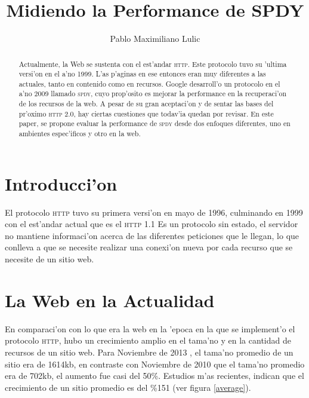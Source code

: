 \documentclass[a4paper,11pt,twocolumn]{article}
\begin{document}
\setlength{\columnsep}{25pt}

\title{Midiendo la Performance de SPDY}
\author{Pablo Maximiliano Lulic}

\maketitle

\begin{abstract} 
Actualmente, la Web se sustenta con el est'andar \textsc{http}. Este protocolo tuvo su 'ultima versi'on en el a'no 1999. L'as p'aginas en ese entonces eran muy diferentes a las actuales, tanto en contenido como en recursos. Google desarroll'o un protocolo en el a'no 2009 llamado \textsc{spdy}, cuyo prop'osito es mejorar la performance en la recuperaci'on de los recursos de la web. A pesar de su gran aceptaci'on y de sentar las bases del pr'oximo \textsc{http 2.0}, hay ciertas cuestiones que todav'ia quedan por revisar. En este paper, se propone evaluar la performance de \textsc{spdy} desde dos enfoques diferentes, uno en ambientes espec'ificos y otro en la web.
\end{abstract}

\section{Introducci'on}

El protocolo \textsc{http} tuvo su primera versi'on en mayo de 1996, culminando en 1999 con el est'andar actual que es el \textsc{http}  1.1 \cite{rfcHTTP} Es un protocolo sin estado, el servidor no mantiene informaci'on acerca de las diferentes peticiones que le llegan, lo que conlleva a que se necesite realizar una conexi'on nueva por cada recurso que se necesite de un sitio web.

\section{La Web en la Actualidad}

En comparaci'on con lo que era la web en la 'epoca en la que se implement'o el protocolo \textsc{http}, hubo un crecimiento amplio en el tama'no y en la cantidad de recursos de un sitio web. Para Noviembre de 2013 \cite{httpArchive}, el tama'no promedio de un sitio era de 1614kb, en contraste con Noviembre de 2010 que el tama'no promedio era de 702kb, el aumento fue casi del 50\%. Estudios m'as recientes, indican que el crecimiento de un sitio promedio es del \%151 \cite{tammy} (ver figura \ref{average}).
\end{document}
